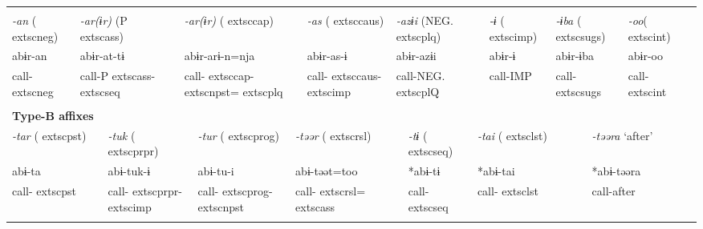 \tabletail{}
\tablelasttail{}
\begin{tabularx}{\textwidth}{XXXXXXXXXXXXXXXXXXXXXX}
\lsptoprule
\multicolumn{22}{X}{{\bfseries Type-A affixes}}\\
{ \textit{{}-an} (	extsc{neg})} & \multicolumn{3}{X}{{ \textit{{}-ar(ɨr)} (P	extsc{ass})}} & \multicolumn{5}{X}{{ \textit{{}-ar(ɨr)} (	extsc{cap})}} & \multicolumn{3}{X}{{ \textit{{}-as} (	extsc{caus})}} & \multicolumn{5}{X}{{ \textit{{}-azɨi} (NEG.	extsc{plq})}} & { \textit{{}-ɨ} (	extsc{imp})} & \multicolumn{2}{X}{{ \textit{{}-ɨba} (	extsc{sugs})}} & { \textit{{}-oo}(	extsc{int})} & \\
{ abɨr-an} & \multicolumn{3}{X}{{ abɨr-at-tɨ}} & \multicolumn{5}{X}{{ abɨr-arɨ-n=nja}} & \multicolumn{3}{X}{{ abɨr-as-ɨ}} & \multicolumn{5}{X}{{ abɨr-azɨi}} & { abɨr-ɨ} & \multicolumn{2}{X}{{ abɨr-ɨba}} & { abɨr-oo} & \\
call-	extsc{neg} & \multicolumn{3}{X}{call-P	extsc{ass}-	extsc{seq}} & \multicolumn{5}{X}{call-	extsc{cap}-	extsc{npst}=	extsc{plq}} & \multicolumn{3}{X}{call-	extsc{caus}-	extsc{imp}} & \multicolumn{5}{X}{call-NEG.	extsc{pl}Q} & call-IMP & \multicolumn{2}{X}{call-	extsc{sugs}} & call-	extsc{int} & \\
\multicolumn{22}{X}{}\\
\multicolumn{22}{X}{{\bfseries Type-B affixes}}\\
\multicolumn{2}{X}{{ \textit{{}-tar} (	extsc{pst})}} & \multicolumn{3}{X}{{ \textit{{}-tuk} (	extsc{prpr})}} & \multicolumn{3}{X}{{ \textit{{}-tur} (	extsc{prog})}} & \multicolumn{5}{X}{{ \textit{{}-təər} (	extsc{rsl})}} & \multicolumn{3}{X}{{ \textit{{}-tɨ} (	extsc{seq})}} & \multicolumn{3}{X}{{ \textit{{}-tai} (	extsc{lst})}} & \multicolumn{3}{X}{{ \textit{{}-təəra} ‘after’}}\\
\multicolumn{2}{X}{{ abɨ-ta}} & \multicolumn{3}{X}{{ abɨ-tuk-ɨ}} & \multicolumn{3}{X}{{ abɨ-tu-i}} & \multicolumn{5}{X}{{ abɨ-təət=too}} & \multicolumn{3}{X}{{ *abɨ-tɨ}} & \multicolumn{3}{X}{{ *abɨ-tai}} & \multicolumn{3}{X}{{ *abɨ-təəra}}\\
\multicolumn{2}{X}{call-	extsc{pst}} & \multicolumn{3}{X}{call-	extsc{prpr}-	extsc{imp}} & \multicolumn{3}{X}{call-	extsc{prog}-	extsc{npst}} & \multicolumn{5}{X}{call-	extsc{rsl}=	extsc{ass}} & \multicolumn{3}{X}{call-	extsc{seq}} & \multicolumn{3}{X}{call-	extsc{lst}} & \multicolumn{3}{X}{{ call-after}}\\
\multicolumn{2}{X}{} & \multicolumn{3}{X}{} & \multicolumn{3}{X}{} & \multicolumn{5}{X}{} & \multicolumn{3}{X}{} & \multicolumn{3}{X}{} & \multicolumn{3}{X}{}\\

\end{tabularx}

